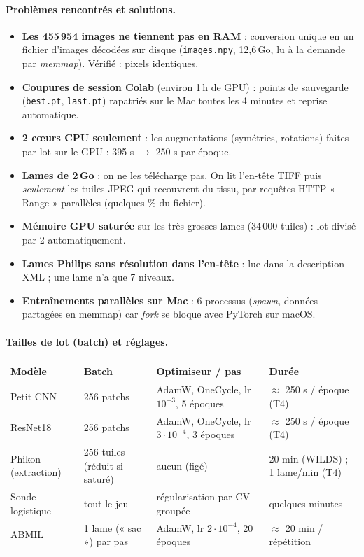 \documentclass[11pt,a4paper]{article}
\begin{document}
\paragraph{Problèmes rencontrés et solutions.}
\begin{itemize}
  \item \textbf{Les 455\,954 images ne tiennent pas en RAM} : conversion unique en un fichier d'images décodées sur disque
        (\texttt{images.npy}, 12,6\,Go, lu à la demande par \emph{memmap}). Vérifié : pixels identiques.
  \item \textbf{Coupures de session Colab} (environ 1\,h de GPU) : points de sauvegarde (\texttt{best.pt}, \texttt{last.pt})
        rapatriés sur le Mac toutes les 4 minutes et reprise automatique.
  \item \textbf{2 cœurs CPU seulement} : les augmentations (symétries, rotations) faites par lot sur le GPU : 395 s $\to$ 250 s par époque.
  \item \textbf{Lames de 2\,Go} : on ne les télécharge pas. On lit l'en-tête TIFF puis \emph{seulement} les tuiles JPEG qui
        recouvrent du tissu, par requêtes HTTP « Range » parallèles (quelques \% du fichier).
  \item \textbf{Mémoire GPU saturée} sur les très grosses lames (34\,000 tuiles) : lot divisé par 2 automatiquement.
  \item \textbf{Lames Philips sans résolution dans l'en-tête} : lue dans la description XML ; une lame n'a que 7 niveaux.
  \item \textbf{Entraînements parallèles sur Mac} : 6 processus (\emph{spawn}, données partagées en memmap) car
        \emph{fork} se bloque avec PyTorch sur macOS.
\end{itemize}

\paragraph{Tailles de lot (batch) et réglages.}
\begin{table}[H]
\centering
\small
\begin{tabularx}{\textwidth}{lXXX}
\toprule
\textbf{Modèle} & \textbf{Batch} & \textbf{Optimiseur / pas} & \textbf{Durée} \\
\midrule
Petit CNN & 256 patchs & AdamW, OneCycle, lr $10^{-3}$, 5 époques & $\approx$ 250 s / époque (T4) \\
ResNet18 & 256 patchs & AdamW, OneCycle, lr $3\cdot10^{-4}$, 3 époques & $\approx$ 250 s / époque (T4) \\
Phikon (extraction) & 256 tuiles (réduit si saturé) & aucun (figé) & 20 min (WILDS) ; 1 lame/min (T4) \\
Sonde logistique & tout le jeu & régularisation par CV groupée & quelques minutes \\
ABMIL & 1 lame (« sac ») par pas & AdamW, lr $2\cdot10^{-4}$, 20 époques & $\approx$ 20 min / répétition \\
\bottomrule
\end{tabularx}
\end{table}
\end{document}
